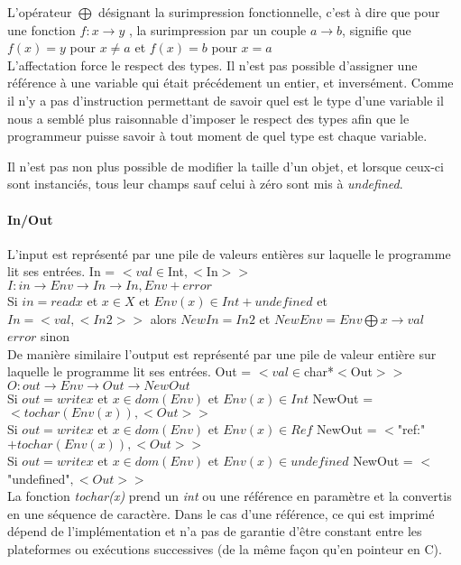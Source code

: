 L'opérateur $\bigoplus$ désignant la surimpression fonctionnelle, c'est à dire que  pour une fonction $f : x \rightarrow y $ , la surimpression par un couple  $ a \rightarrow b $, signifie que $f(x)=y$ pour $x \neq a$ et $f(x)=b$ pour $x = a$\\

L'affectation force le respect des types. Il n'est pas possible d'assigner une référence à une variable qui était 
précédement un entier, et inversément. Comme il n'y a pas d'instruction permettant de savoir quel est le type d'une variable il 
nous a semblé plus raisonnable d'imposer le respect des types afin que le programmeur puisse savoir à tout moment
de quel type est chaque variable. 

Il n'est pas non plus possible de modifier la taille d'un objet, et lorsque ceux-ci sont instanciés, tous leur champs sauf
celui à zéro sont mis à \emph{undefined}.  

\paragraph{In/Out}
L'input est représenté par une pile de valeurs entières sur laquelle le programme lit ses entrées. 
In = $< val \in $Int$, <$In$>>$\\
$I : in \rightarrow Env \rightarrow In \rightarrow {In,Env} + {error}$\\
Si $in = read x$ et $x \in X$ et $ Env(x) \in Int + {undefined} $ et $In = < val, <In2>>$ alors $NewIn = In2$ et $NewEnv = Env \bigoplus x \rightarrow val $\\
$error$ sinon\\

De manière similaire l'output est représenté par une pile de valeur entière sur laquelle le programme lit ses entrées. 
Out = $< val \in $char*$ <$Out$>>$\\
$O : out \rightarrow Env \rightarrow  Out \rightarrow NewOut $\\
Si $out = write x$ et $x \in dom(Env)$ et $Env(x) \in Int$ NewOut = $<tochar(Env(x)),<Out>>$\\
Si $out = write x$ et $x \in dom(Env)$ et $Env(x) \in Ref$ NewOut = $<$"ref:"$+tochar(Env(x)),<Out>>$\\
Si $out = write x$ et $x \in dom(Env)$ et $Env(x) \in {undefined}$ NewOut = $<$"undefined"$,<Out>>$\\

La fonction \emph{tochar(x)} prend un \emph{int} ou une référence en paramètre et la convertis en une séquence de caractère. 
Dans le cas d'une référence, ce qui est imprimé dépend de l'implémentation et n'a pas de garantie d'être
constant entre les plateformes ou exécutions successives (de la même façon qu'en pointeur en C). 


